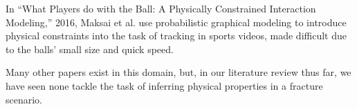 \documentclass[10pt,twocolumn,letterpaper]{article}
\begin{document}
In “What Players do with the Ball: A Physically Constrained Interaction Modeling,” 
2016, Maksai et al. use probabilistic graphical modeling to introduce physical 
constraints into the task of tracking in sports videos, made difficult due to 
the balls’ small size and quick speed.

Many other papers exist in this domain, but, in our literature review thus far, 
we have seen none tackle the task of inferring physical properties in a fracture 
scenario.

{\small


}
\end{document}
